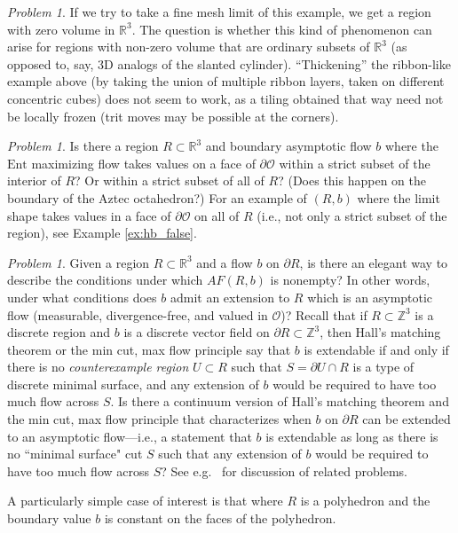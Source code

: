 \documentclass[11pt]{article}
\theoremstyle{remark}
\newtheorem{problem}[thm]{Problem}
\theoremstyle{definition}
\newcommand{\Ent}{\text{Ent}}
\newcommand{\mc}[1]{\mathcal{#1}}
\newcommand{\m}[1]{\mathbb{#1}}
\begin{document}
\begin{problem}
If we try to take a fine mesh limit of this example, we get a region with zero volume in $\mathbb R^3$. The question is whether this kind of phenomenon can arise for regions with non-zero volume that are ordinary subsets of $\mathbb R^3$ (as opposed to, say, 3D analogs of the slanted cylinder). ``Thickening'' the ribbon-like example above (by taking the union of multiple ribbon layers, taken on different concentric cubes) does not seem to work, as a tiling obtained that way need not be locally frozen (trit moves may be possible at the corners).

\end{problem}


\begin{problem}\label{prob:limit_shape_values}
Is there a region $R\subset \m R^3$ and boundary asymptotic flow $b$ where the $\Ent$ maximizing flow takes values on a face of $\partial \mc O$ within a strict subset of the interior of $R$? Or within a strict subset of all of $R$? (Does this happen on the boundary of the Aztec octahedron?) For an example of $(R,b)$ where the limit shape takes values in a face of $\partial \mc O$ on all of $R$ (i.e., not only a strict subset of the region), see Example \ref{ex:hb_false}. 
\end{problem}

\begin{problem}
    Given a region $R\subset \m R^3$ and a flow $b$ on $\partial R$, is there an elegant way to describe the conditions under which $AF(R,b)$ is nonempty? In other words, under what conditions does $b$ admit an extension to $R$ which is an asymptotic flow (measurable, divergence-free, and valued in $\mc O$)? Recall that if $R\subset \m Z^3$ is a discrete region and $b$ is a discrete vector field on $\partial R\subset \m Z^3$, then Hall's matching theorem or the min cut, max flow principle say that $b$ is extendable if and only if there is no \textit{counterexample region} $U\subset R$ such that $S = \partial U\cap R$ is a type of discrete minimal surface, and any extension of $b$ would be required to have too much flow across $S$. Is there a continuum version of Hall's matching theorem and the min cut, max flow principle that characterizes when $b$ on $\partial R$ can be extended to an asymptotic flow---i.e., a statement that $b$ is extendable as long as there is no ``minimal surface" cut $S$ such that any extension of $b$ would be required to have too much flow across $S$? See e.g.\ \cite{Strang2010} for discussion of related problems.

    A particularly simple case of interest is that where $R$ is a polyhedron and the boundary value $b$ is constant on the faces of the polyhedron.
\end{problem}
\end{document}

